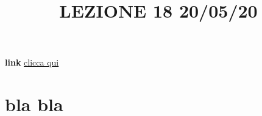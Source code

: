 \title{LEZIONE 18 20/05/20}
\textbf{link} \href{https://web.microsoftstream.com/video/71a20262-9f5a-4991-8c41-af0a21825730?list=user&userId=cfe0965d-9a7c-40e2-be6e-f078296a1914}{clicca qui}
\section{bla bla}